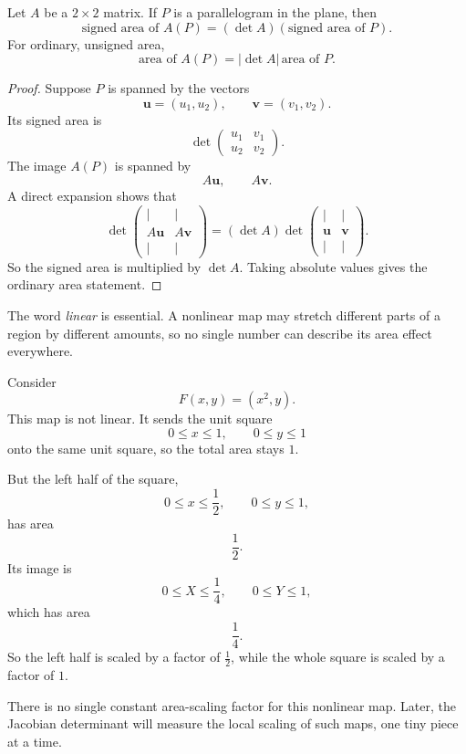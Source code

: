 \begin{theorem}
Let \(A\) be a \(2\times2\) matrix.  If \(P\) is a parallelogram in the plane, then
\[
\boxed{
    \text{signed area of }A(P)
    =
    (\det A)(\text{signed area of }P).
}
\]
For ordinary, unsigned area,
\[
\boxed{
    \text{area of }A(P)
    =
    |\det A|\,\text{area of }P.
}
\]
\end{theorem}

\begin{proof}
Suppose \(P\) is spanned by the vectors
\[
    \mathbf u=(u_1,u_2),
    \qquad
    \mathbf v=(v_1,v_2).
\]
Its signed area is
\[
    \det
    \begin{pmatrix}
        u_1&v_1\\
        u_2&v_2
    \end{pmatrix}.
\]
The image \(A(P)\) is spanned by
\[
    A\mathbf u,
    \qquad
    A\mathbf v.
\]
A direct expansion shows that
\[
    \det
    \begin{pmatrix}
        |&|\\
        A\mathbf u&A\mathbf v\\
        |&|
    \end{pmatrix}
    =
    (\det A)
    \det
    \begin{pmatrix}
        |&|\\
        \mathbf u&\mathbf v\\
        |&|
    \end{pmatrix}.
\]
So the signed area is multiplied by \(\det A\).  Taking absolute values gives the
ordinary area statement.
\end{proof}

The word \emph{linear} is essential.  A nonlinear map may stretch different parts of a
region by different amounts, so no single number can describe its area effect everywhere.

\begin{example}
Consider
\[
    F(x,y)=(x^2,y).
\]
This map is not linear.  It sends the unit square
\[
    0\le x\le1,\qquad 0\le y\le1
\]
onto the same unit square, so the total area stays \(1\).

But the left half of the square,
\[
    0\le x\le \frac12,\qquad 0\le y\le1,
\]
has area
\[
    \frac12.
\]
Its image is
\[
    0\le X\le \frac14,\qquad 0\le Y\le1,
\]
which has area
\[
    \frac14.
\]
So the left half is scaled by a factor of \(\frac12\), while the whole square is scaled
by a factor of \(1\).

There is no single constant area-scaling factor for this nonlinear map.  Later, the
Jacobian determinant will measure the local scaling of such maps, one tiny piece at a
time.
\end{example}

